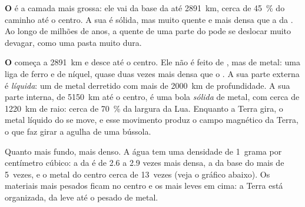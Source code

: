 \textbf{O } é a camada mais grossa: ele vai da base da  até
2891~km, cerca de 45~\% do caminho até o centro. A sua  é sólida, mas
muito quente e mais densa que a  da . Ao longo de milhões de
anos, a  quente de uma parte do  pode se deslocar muito devagar,
como uma pasta muito dura.

\textbf{O } começa a 2891~km e desce até o centro. Ele não é feito de
, mas de metal: uma liga de ferro e de níquel, quase duas vezes mais
densa que o . A sua parte externa é \emph{líquida}: um  de metal
derretido com mais de 2000~km de profundidade. A sua parte interna, de
5150~km até o centro, é uma bola \emph{sólida} de metal, com cerca de 1220~km de raio: cerca de 70~\% da largura da Lua. Enquanto a Terra gira, o metal líquido do
 se move, e esse movimento produz o campo magnético da Terra,
o que faz girar a agulha de uma bússola.

Quanto mais fundo, mais denso. A água tem uma densidade de 1~grama por
centímetro cúbico: a  da  é de 2.6 a 2.9 vezes mais densa, a
 da base do  mais de 5~vezes, e o metal do centro cerca de
13~vezes (veja o gráfico abaixo). Os materiais mais pesados ficam no centro e os mais leves em cima: a Terra está organizada, da  leve até o  pesado de metal.


